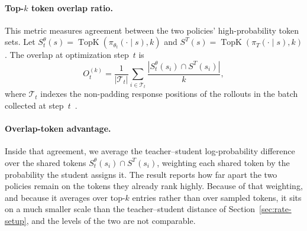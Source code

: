 \paragraph{Top-$k$ token overlap ratio.}
This metric measures agreement between the two policies' high-probability token sets. Let $S_t^\theta(s)=\operatorname{TopK}(\pi_{\theta_t}(\cdot\mid s),k)$ and $S^T(s)=\operatorname{TopK}(\pi_T(\cdot\mid s),k)$. The overlap at optimization step~$t$ is
\begin{equation}
    O_t^{(k)}
    =
    \frac{1}{|\mathcal{T}_t|}
    \sum_{i\in\mathcal{T}_t}
    \frac{|S_t^\theta(s_i)\cap S^T(s_i)|}{k},
    \label{eq:topk-overlap}
\end{equation}
where $\mathcal{T}_t$ indexes the non-padding response positions of the rollouts in the batch collected at step~$t$~\citep{li2026rethinking}.

\paragraph{Overlap-token advantage.}
Inside that agreement, we average the teacher--student log-probability difference over the shared tokens $S_t^\theta(s_i)\cap S^T(s_i)$, weighting each shared token by the probability the student assigns it. The result reports how far apart the two policies remain on the tokens they already rank highly. Because of that weighting, and because it averages over top-$k$ entries rather than over sampled tokens, it sits on a much smaller scale than the teacher--student distance of Section~\ref{sec:rate-setup}, and the levels of the two are not comparable.
